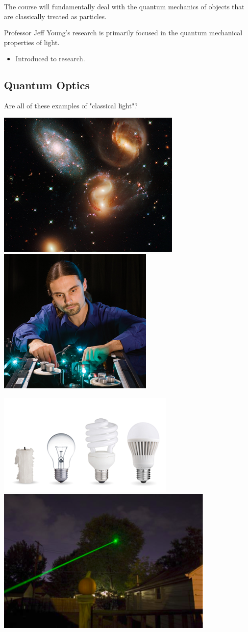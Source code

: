 \documentclass{article}
\begin{document}
The course will fundamentally deal with the quantum mechanics of objects that are classically treated as particles. 

Professor Jeff Young's research is primarily focused in the quantum mechanical properties of light. 

\begin{itemize}
    \item Introduced to research. 
\end{itemize}

\subsection{Quantum Optics}

Are all of these examples of "classical light"?

\includegraphics[width = 0.47 \textwidth]{Lecture01/1.png}
\includegraphics[width = 0.47 \textwidth]{Lecture01/2.png}


\includegraphics[width = 0.47 \textwidth]{Lecture01/3.png}
\includegraphics[width = 0.47 \textwidth]{Lecture01/4.png}
\end{document}

